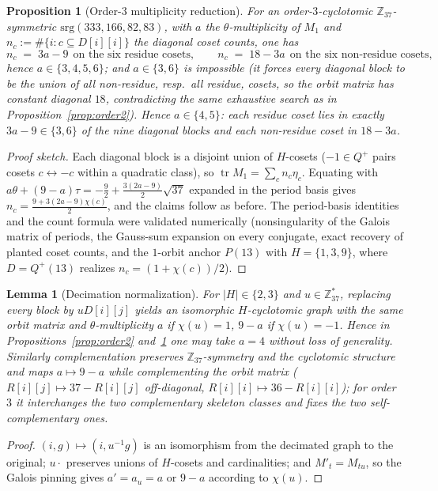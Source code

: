 \documentclass[11pt]{article}
\newtheorem{lemma}{Lemma}
\newtheorem{proposition}{Proposition}
\theoremstyle{definition}
\newcommand{\Z}{\mathbb{Z}}
\begin{document}
\begin{proposition}[Order-3 multiplicity reduction]\label{prop:order3}
For an order-$3$-cyclotomic $\Z_{37}$-symmetric $\mathrm{srg}(333,166,82,83)$, with
$a$ the $\theta$-multiplicity of $M_1$ and $n_c:=\#\{i: c\subseteq D[i][i]\}$ the diagonal coset
counts, one has
\[
n_c \;=\; 3a-9\ \ \text{on the six residue cosets},\qquad n_c \;=\; 18-3a\ \ \text{on the six
non-residue cosets},
\]
hence $a\in\{3,4,5,6\}$; and $a\in\{3,6\}$ is impossible (it forces every diagonal block to be the union
of all non-residue, resp.\ all residue, cosets, so the orbit matrix has constant diagonal $18$,
contradicting the same exhaustive search as in Proposition~\ref{prop:order2}). Hence $a\in\{4,5\}$: each
residue coset lies in exactly $3a-9\in\{3,6\}$ of the nine diagonal blocks and each non-residue coset in
$18-3a$.
\end{proposition}
\begin{proof}[Proof sketch]
Each diagonal block is a disjoint union of $H$-cosets ($-1\in Q^{+}$ pairs cosets $c\leftrightarrow-c$
within a quadratic class), so $\operatorname{tr}M_1=\sum_c n_c\eta_c$. Equating with
$a\theta+(9-a)\tau=-\tfrac92+\tfrac{3(2a-9)}{2}\sqrt{37}$ expanded in the period basis gives
$n_c=\tfrac{9+3(2a-9)\chi(c)}{2}$, and the claims follow as before. The period-basis identities and the
count formula were validated numerically (nonsingularity of the Galois matrix of periods, the Gauss-sum
expansion on every conjugate, exact recovery of planted coset counts, and the $1$-orbit anchor $P(13)$
with $H=\{1,3,9\}$, where $D=Q^{+}(13)$ realizes $n_c=(1+\chi(c))/2$).
\end{proof}

\begin{lemma}[Decimation normalization]\label{lem:decim}
For $|H|\in\{2,3\}$ and $u\in\Z_{37}^\ast$, replacing every block by $uD[i][j]$ yields an isomorphic
$H$-cyclotomic graph with the same orbit matrix and $\theta$-multiplicity $a$ if
$\chi(u)=1$, $9-a$ if $\chi(u)=-1$. Hence in Propositions~\ref{prop:order2} and~\ref{prop:order3} one may
take $a=4$ without loss of generality. Similarly complementation preserves $\Z_{37}$-symmetry and the
cyclotomic structure and maps $a\mapsto 9-a$ while complementing the orbit matrix
($R[i][j]\mapsto 37-R[i][j]$ off-diagonal, $R[i][i]\mapsto 36-R[i][i]$); for order $3$ it interchanges
the two complementary skeleton classes and fixes the two self-complementary ones.
\end{lemma}
\begin{proof}
$(i,g)\mapsto(i,u^{-1}g)$ is an isomorphism from the decimated graph to the original; $u\cdot$ preserves
unions of $H$-cosets and cardinalities; and $M'_t=M_{tu}$, so the Galois pinning gives
$a'=a_{u}=a$ or $9-a$ according to $\chi(u)$.
\end{proof}
\end{document}
